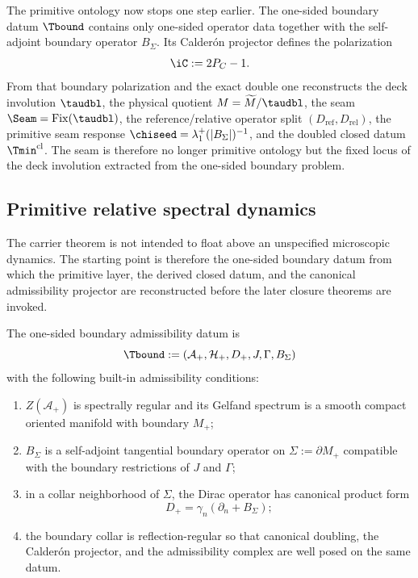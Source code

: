 \begin{remark}
The primitive ontology now stops one step earlier. The one-sided boundary datum $\Tbound$
contains only one-sided operator data together with the self-adjoint boundary operator
$B_\Sigma$. Its Calder\'on projector defines the polarization
\[
\iC:=2P_C-1.
\]
From that boundary polarization and the exact double one reconstructs the deck involution
$\taudbl$, the physical quotient $M=\widetilde M/\taudbl$, the seam
$\Seam=\mathrm{Fix}(\taudbl)$, the reference/relative operator split
$(D_{\mathrm{ref}},D_{\mathrm{rel}})$, the primitive seam response
$\chiseed=\lambda_1^+(|B_\Sigma|)^{-1}$, and the doubled closed datum
$\Tmin^{\mathrm{cl}}$. The seam is therefore no longer primitive ontology but the fixed locus of
the deck involution extracted from the one-sided boundary problem.
\end{remark}

\subsection{Primitive relative spectral dynamics}

The carrier theorem is not intended to float above an unspecified microscopic dynamics. The
starting point is therefore the one-sided boundary datum from which the primitive layer, the
derived closed datum, and the canonical admissibility projector are reconstructed before the later
closure theorems are invoked.

\begin{definition}
\label{def:reduced-theorem-datum}
The one-sided boundary admissibility datum is
\[
\Tbound:=(\mathcal A_+,\mathcal H_+,D_+,J,\Gamma,B_\Sigma)
\]
with the following built-in admissibility conditions:
\begin{enumerate}[label=(\roman*), leftmargin=1.5em, topsep=3pt, itemsep=2pt]
    \item $Z(\mathcal A_+)$ is spectrally regular and its Gelfand spectrum is a smooth compact oriented manifold with boundary $M_+$;
    \item $B_\Sigma$ is a self-adjoint tangential boundary operator on $\Sigma:=\partial M_+$ compatible with the boundary restrictions of $J$ and $\Gamma$;
    \item in a collar neighborhood of $\Sigma$, the Dirac operator has canonical product form
    \[
    D_+=\gamma_n(\partial_n+B_\Sigma);
    \]
    \item the boundary collar is reflection-regular so that canonical doubling, the Calder\'on projector, and the admissibility complex are well posed on the same datum.
\end{enumerate}
\end{definition}

